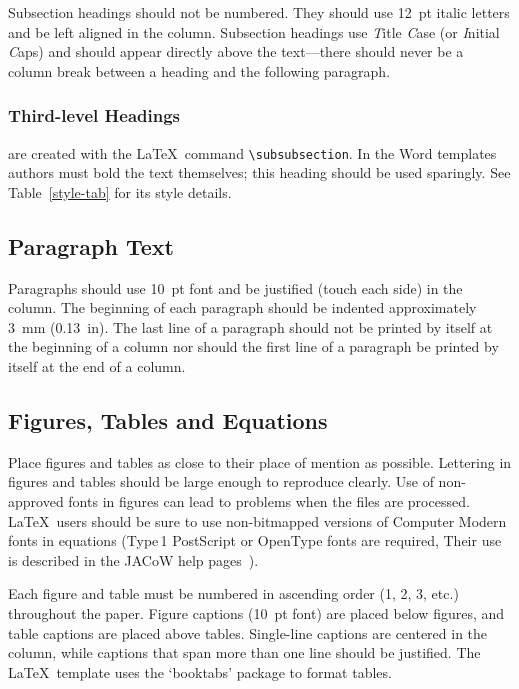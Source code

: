\documentclass[a4paper,
              ]{jacow}
\begin{document}
Subsection  headings  should  not  be  numbered.
They should use \SI{12}{pt} italic letters and be left aligned in the column.
Subsection headings use \emph{T}itle \emph{C}ase (or \emph{I}nitial \emph{C}aps)
and should appear directly above the text---there should never be a column break
between a heading and the following paragraph.

\subsubsection{Third-level Headings} are created with the \LaTeX\ command \verb|\subsubsection|.
In the Word templates authors must bold the text themselves; this
heading should be used sparingly. See Table~\ref{style-tab} for its
style details.

\subsection{Paragraph Text}

Paragraphs should use \SI{10}{pt} font and be justified (touch each side) in
the column. The beginning of each paragraph should be indented
approximately \SI{3}{mm} (\SI{0.13}{in}). The last line of a paragraph should not be
printed by itself at the beginning of a column nor should the first line of
a paragraph be printed by itself at the end of a column.

\subsection{Figures, Tables and Equations}

Place figures and tables as close to their place of mention as
possible. Lettering in figures and tables should be large enough to
reproduce clearly. Use of non-approved fonts in figures can lead to
problems when the files are processed. \LaTeX\ users should be sure to use
non-bitmapped versions of Computer Modern fonts in equations (Type\,1 PostScript
or OpenType fonts are required, Their use is described in the JACoW help
pages~\cite{jacow-help}).

Each figure and table must be numbered in ascending order (1, 2, 3, etc.) throughout
the paper. Figure captions (\SI{10}{pt} font) are placed below figures, and table captions are placed above tables. Single-line captions are centered in the column, while captions that span more than one line should be justified. The \LaTeX\ template uses the ‘booktabs’ package to
format tables.
\end{document}
